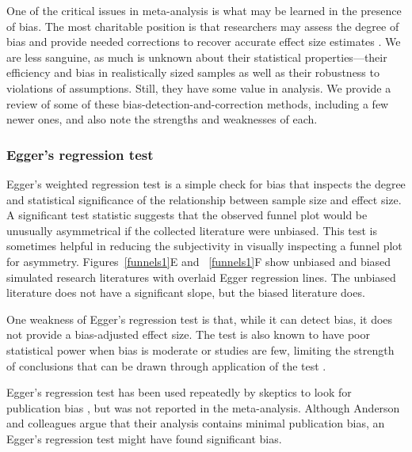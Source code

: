 \documentclass[man, mask]{apa6}
\begin{document}
One of the critical issues in meta-analysis is what may be learned in the presence of bias. The most charitable position is that researchers may assess the degree of bias and provide needed corrections to recover accurate effect size estimates \citep[e.g.,][]{Duval:Tweedie:2000,Simonsohn:etal:2014b}.  We are less sanguine, as much is unknown about their statistical properties---their efficiency and bias in realistically sized samples as well as their robustness to violations of assumptions.  Still, they have some value in analysis. We provide a review of some of these bias-detection-and-correction methods, including a few newer ones, and also note the strengths and weaknesses of each. 

\subsubsection{Egger's regression test}
Egger's weighted regression test \citep{Sterne:Egger:2005} is a simple check for bias that inspects the degree and statistical significance of the relationship between sample size and effect size. A significant test statistic suggests that the observed funnel plot would be unusually asymmetrical if the collected literature were unbiased. This test is sometimes helpful in reducing the subjectivity in visually inspecting a funnel plot for asymmetry. Figures~\ref{funnels1}E and ~\ref{funnels1}F show unbiased and biased simulated research literatures with overlaid Egger regression lines. The unbiased literature does not have a significant slope, but the biased literature does. 

One weakness of Egger's regression test is that, while it can detect bias, it does not provide a bias-adjusted effect size. The test is also known to have poor statistical power when bias is moderate or studies are few, limiting the strength of conclusions that can be drawn through application of the test \citep{Sterne:etal:2000}.

Egger's regression test has been used repeatedly by skeptics to look for publication bias \citep[e.g.,][]{Ferguson:2007,Ferguson:Kilburn:2009}, but was not reported in the \citet{Anderson:etal:2010} meta-analysis. Although Anderson and colleagues argue that their analysis contains minimal publication bias, an Egger's regression test might have found significant bias.
\end{document}
